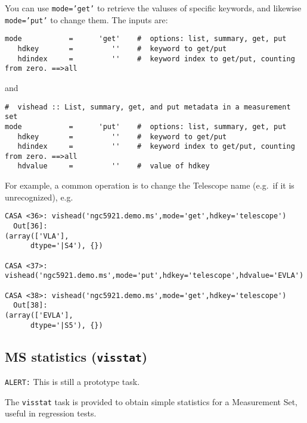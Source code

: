 You can use {\tt mode='get'} to retrieve the valuses of specific
keywords, and likewise {\tt mode='put'} to change them.
The inputs are:
\small
\begin{verbatim}
mode           =      'get'    #  options: list, summary, get, put
   hdkey       =         ''    #  keyword to get/put
   hdindex     =         ''    #  keyword index to get/put, counting from zero. ==>all
\end{verbatim}
\normalsize
and
\small
\begin{verbatim}
#  vishead :: List, summary, get, and put metadata in a measurement set
mode           =      'put'    #  options: list, summary, get, put
   hdkey       =         ''    #  keyword to get/put
   hdindex     =         ''    #  keyword index to get/put, counting from zero. ==>all
   hdvalue     =         ''    #  value of hdkey
\end{verbatim}
\normalsize
For example, a common operation is to change the Telescope name (e.g.\
if it is unrecognized), e.g.
\small
\begin{verbatim}
CASA <36>: vishead('ngc5921.demo.ms',mode='get',hdkey='telescope')
  Out[36]: 
(array(['VLA'], 
      dtype='|S4'), {})

CASA <37>: vishead('ngc5921.demo.ms',mode='put',hdkey='telescope',hdvalue='EVLA')

CASA <38>: vishead('ngc5921.demo.ms',mode='get',hdkey='telescope')
  Out[38]: 
(array(['EVLA'], 
      dtype='|S5'), {})
\end{verbatim}
\normalsize


\subsection{MS statistics ({\tt visstat})}
\label{section:io.vis.visstat}

{\tt ALERT:} This is still a prototype task.

The {\tt visstat} task is provided to obtain simple statistics for a
Measurement Set, useful in regression tests.

